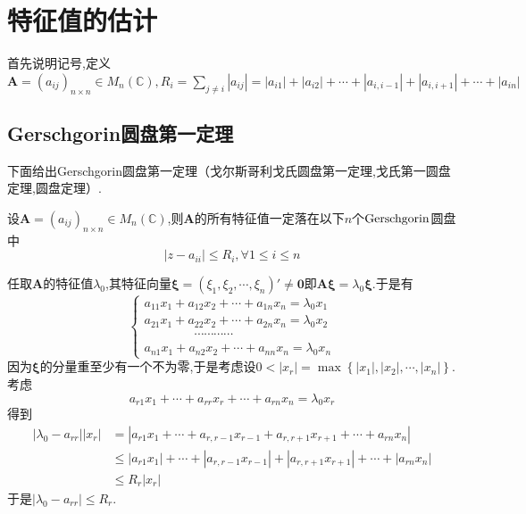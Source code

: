 \section{特征值的估计}
\begin{red}
\begin{remark}
    首先说明记号,定义$\displaystyle
    \bm{A}=\left(
        a_{ij}
    \right)_{n\times n}\in M_n\left(\mathbb{C}\right),R_i=\sum_{j\neq i}\left|a_{ij}\right|=\left|
    a_{i1}
    \right|+
    \left|
    a_{i2}
    \right|+\cdots+\left|
    a_{i,i-1}
    \right|+\left|
    a_{i,i+1}
    \right|+
    \cdots+\left|
    a_{in}
    \right|
    $
\end{remark}
\end{red}
\subsection{Gerschgorin圆盘第一定理}
下面给出Gerschgorin圆盘第一定理（戈尔斯哥利戈氏圆盘第一定理,戈氏第一圆盘定理,圆盘定理）.
\begin{formal}
\begin{theorem}[Gerschgorin圆盘第一定理]\label{thm:Gerschgorin圆盘第一定理}
    设$\bm{A}=\left(
        a_{ij}
    \right)_{n\times n}\in M_n\left(\mathbb{C}\right)$,则$\bm{A}$的所有特征值一定落在以下$n$个$\textup{Gerschgorin}$圆盘中
    \[
    \left|
        z-  a_{ii}
    \right|\leqslant R_i,\forall 1\leqslant i\leqslant n
    \]
\end{theorem}
\begin{Proof}
任取$\bm{A}$的特征值$\lambda_0$,其特征向量$\bm{\xi}=\left(
    \xi_1,\xi_2,\cdots,\xi_n
\right)'\neq \bm{0}$即$\bm{A\xi}=\lambda_0\bm{\xi}.$于是有
\[
\begin{cases*}
a_{11}x_1+a_{12}x_2+\cdots+a_{1n}x_n=\lambda_0x_1\\
a_{21}x_1+a_{22}x_2+\cdots+a_{2n}x_n=\lambda_0x_2\\
\qquad\qquad\cdots\cdots\cdots\cdots\\
a_{n1}x_1+a_{n2}x_2+\cdots+a_{nn}x_n=\lambda_0x_n
\end{cases*}
\]因为$\bm{\xi}$的分量重至少有一个不为零,于是考虑设$0<\left|x_r\right|=\max\left\{
    \left|x_1\right|,\left|x_2\right|,\cdots,\left|x_n\right|
\right\}.$考虑
\[
a_{r1}x_1+\cdots+a_{rr}x_r+\cdots+a_{rn}x_n=\lambda_0x_r
\]得到
\begin{align*}
    \left|
        \lambda_0-a_{rr}
    \right|
    \left|x_r\right|&=\left|
        a_{r1}x_1+\cdots+a_{r,r-1}x_{r-1}+a_{r,r+1}x_{r+1}+\cdots+a_{rn}x_n
    \right|\\
    &\leqslant \left|
        a_{r1}x_1
    \right|+\cdots+\left|
        a_{r,r-1}x_{r-1}
    \right|+\left|
        a_{r,r+1}x_{r+1}
    \right|+\cdots+\left|
        a_{rn}x_n
    \right|\\
    &\leqslant R_r\left|x_r\right|
\end{align*}于是$\left|
    \lambda_0-a_{rr}
\right|\leqslant R_r$.
\end{Proof}
\end{formal}
